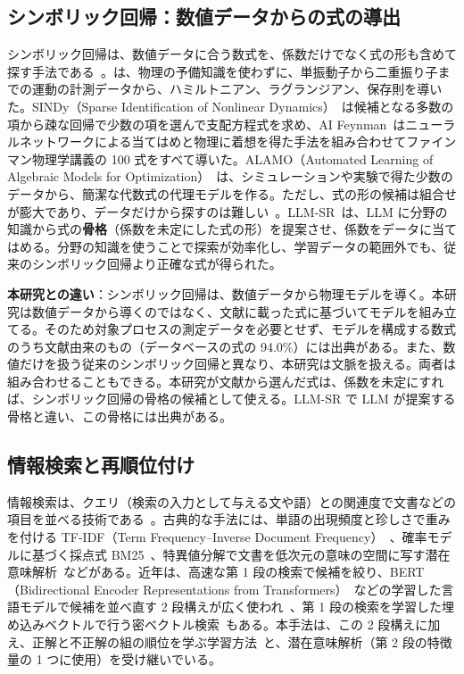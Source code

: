 \documentclass[a4j,dvipdfmx,10pt]{jresume}
\begin{document}
\subsection{シンボリック回帰：数値データからの式の導出}\label{sec:sr}
シンボリック回帰は、数値データに合う数式を、係数だけでなく式の形も含めて探す手法である~\citep{AIFeynman}。\citet{SchmidtLipson}は、物理の予備知識を使わずに、単振動子から二重振り子までの運動の計測データから、ハミルトニアン、ラグランジアン、保存則を導いた。SINDy（Sparse Identification of Nonlinear Dynamics）~\citep{SINDy}は候補となる多数の項から疎な回帰で少数の項を選んで支配方程式を求め、AI Feynman~\citep{AIFeynman}はニューラルネットワークによる当てはめと物理に着想を得た手法を組み合わせてファインマン物理学講義の 100 式をすべて導いた。ALAMO（Automated Learning of Algebraic Models for Optimization）~\citep{ALAMO}は、シミュレーションや実験で得た少数のデータから、簡潔な代数式の代理モデルを作る。ただし、式の形の候補は組合せが膨大であり、データだけから探すのは難しい~\citep{LLMSR}。LLM-SR~\citep{LLMSR}は、LLM に分野の知識から式の\textbf{骨格}（係数を未定にした式の形）を提案させ、係数をデータに当てはめる。分野の知識を使うことで探索が効率化し、学習データの範囲外でも、従来のシンボリック回帰より正確な式が得られた。

\textbf{本研究との違い}：シンボリック回帰は、数値データから物理モデルを導く。本研究は数値データから導くのではなく、文献に載った式に基づいてモデルを組み立てる。そのため対象プロセスの測定データを必要とせず、モデルを構成する数式のうち文献由来のもの（データベースの式の 94.0\%）には出典がある。また、数値だけを扱う従来のシンボリック回帰と異なり、本研究は文脈を扱える。両者は組み合わせることもできる。本研究が文献から選んだ式は、係数を未定にすれば、シンボリック回帰の骨格の候補として使える。LLM-SR で LLM が提案する骨格と違い、この骨格には出典がある。

\subsection{情報検索と再順位付け}\label{sec:ir}
情報検索は、クエリ（検索の入力として与える文や語）との関連度で文書などの項目を並べる技術である~\citep{Manning}。古典的な手法には、単語の出現頻度と珍しさで重みを付ける TF-IDF（Term Frequency--Inverse Document Frequency）~\citep{Salton}、確率モデルに基づく採点式 BM25~\citep{BM25}、特異値分解で文書を低次元の意味の空間に写す潜在意味解析~\citep{LSA}などがある。近年は、高速な第 1 段の検索で候補を絞り、BERT（Bidirectional Encoder Representations from Transformers）~\citep{BERT}などの学習した言語モデルで候補を並べ直す 2 段構えが広く使われ~\citep{BERTrerank}、第 1 段の検索を学習した埋め込みベクトルで行う密ベクトル検索~\citep{DPR}もある。本手法は、この 2 段構えに加え、正解と不正解の組の順位を学ぶ学習方法~\citep{LTR}と、潜在意味解析（第 2 段の特徴量の 1 つに使用）を受け継いでいる。
\end{document}
